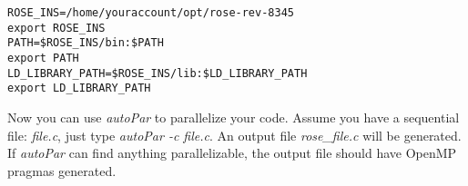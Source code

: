 \begin{verbatim}
ROSE_INS=/home/youraccount/opt/rose-rev-8345
export ROSE_INS
PATH=$ROSE_INS/bin:$PATH
export PATH
LD_LIBRARY_PATH=$ROSE_INS/lib:$LD_LIBRARY_PATH
export LD_LIBRARY_PATH
\end{verbatim}

Now you can use \textit{autoPar} to parallelize your code. 
Assume you have a sequential file: \textit{file.c}, 
just type \textit{autoPar -c file.c}.
An output file \textit{rose\_file.c} will be generated. 
If \textit{autoPar} can find anything parallelizable, the output file should have OpenMP pragmas generated. 

%
